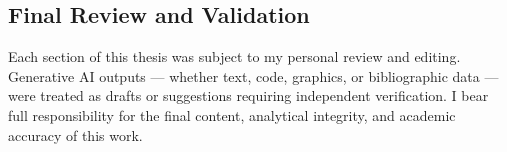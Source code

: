 \subsection{Final Review and Validation}

Each section of this thesis was subject to my personal review and editing. Generative AI outputs --- whether text, code, graphics, or bibliographic data --- were treated as drafts or suggestions requiring independent verification. I bear full responsibility for the final content, analytical integrity, and academic accuracy of this work.
\endinput
